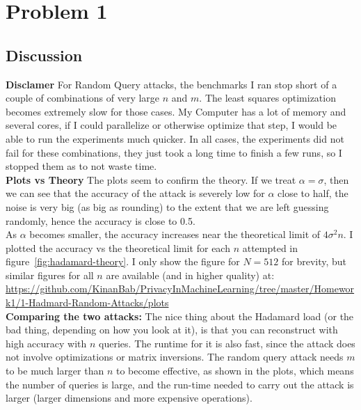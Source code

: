 \section{Problem 1}
\subsection{Discussion}
\noindent \textbf{Disclamer} For Random Query attacks, the benchmarks I ran stop short of a couple of combinations of very large $n$ and $m$. The least squares optimization becomes extremely slow for those cases. My Computer has a lot of memory and several cores, if I could parallelize or otherwise optimize that step, I would be able to run the experiments much quicker. In all cases, the experiments did not fail for these combinations, they just took a long time to finish a few runs, so I stopped them as to not waste time. \\

\noindent \textbf{Plots vs Theory} The plots seem to confirm the theory. If we treat $\alpha = \sigma$, then we can see that the accuracy of the attack is severely low for $\alpha$ close to half, the noise is very big (as big as rounding) to the extent that we are left guessing randomly, hence the accuracy is close to 0.5. \\

\noindent As $\alpha$ becomes smaller, the accuracy increases near the theoretical limit of $4 \sigma^2 n$. I plotted the accuracy vs the theoretical limit for each $n$ attempted in figure~\ref{fig:hadamard-theory}. I only show the figure for $N=512$ for brevity, but similar figures for all $n$ are available (and in higher quality) at: \\
\href{https://github.com/KinanBab/PrivacyInMachineLearning/tree/master/Homework1/1-Hadmard-Random-Attacks/plots}{https://github.com/KinanBab/PrivacyInMachineLearning/tree/master/Homework1/1-Hadmard-Random-Attacks/plots} \\

\noindent \textbf{Comparing the two attacks:} The nice thing about the Hadamard load (or the bad thing, depending on how you look at it), is that you can reconstruct with high accuracy with $n$ queries. The runtime for it is also fast, since the attack does not involve optimizations or matrix inversions. The random query attack needs $m$ to be much larger than $n$ to become effective, as shown in the plots, which means the number of queries is large, and the run-time needed to carry out the attack is larger (larger dimensions and more expensive operations).

